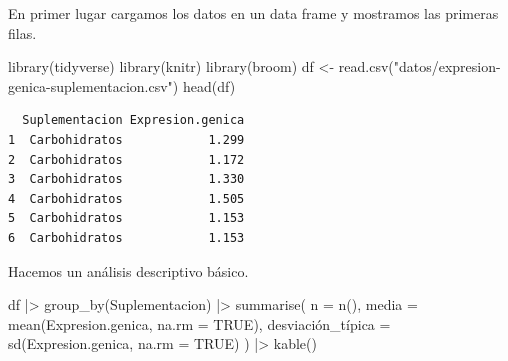 \documentclass[
  spanish,
  a4paper,
]{scrreport}
\newenvironment{Shaded}{\begin{snugshade}}{\end{snugshade}}
\newcommand{\AttributeTok}[1]{\textcolor[rgb]{0.40,0.45,0.13}{#1}}
\newcommand{\ConstantTok}[1]{\textcolor[rgb]{0.56,0.35,0.01}{#1}}
\newcommand{\FunctionTok}[1]{\textcolor[rgb]{0.28,0.35,0.67}{#1}}
\newcommand{\NormalTok}[1]{\textcolor[rgb]{0.00,0.23,0.31}{#1}}
\newcommand{\OtherTok}[1]{\textcolor[rgb]{0.00,0.23,0.31}{#1}}
\newcommand{\SpecialCharTok}[1]{\textcolor[rgb]{0.37,0.37,0.37}{#1}}
\newcommand{\StringTok}[1]{\textcolor[rgb]{0.13,0.47,0.30}{#1}}
\theoremstyle{definition}
\theoremstyle{remark}
\begin{document}
\begin{tcolorbox}[enhanced jigsaw, arc=.35mm, bottomrule=.15mm, bottomtitle=1mm, breakable, colback=white, colbacktitle=quarto-callout-tip-color!10!white, colframe=quarto-callout-tip-color-frame, coltitle=black, left=2mm, leftrule=.75mm, opacityback=0, opacitybacktitle=0.6, rightrule=.15mm, title=\textcolor{quarto-callout-tip-color}{\faLightbulb}\hspace{0.5em}{Solución}, titlerule=0mm, toprule=.15mm, toptitle=1mm]

En primer lugar cargamos los datos en un data frame y mostramos las
primeras filas.

\begin{Shaded}
\begin{Highlighting}[]
\FunctionTok{library}\NormalTok{(tidyverse)}
\FunctionTok{library}\NormalTok{(knitr)}
\FunctionTok{library}\NormalTok{(broom)}
\NormalTok{df }\OtherTok{\textless{}{-}} \FunctionTok{read.csv}\NormalTok{(}\StringTok{"datos/expresion{-}genica{-}suplementacion.csv"}\NormalTok{)}
\FunctionTok{head}\NormalTok{(df)}
\end{Highlighting}
\end{Shaded}

\begin{verbatim}
  Suplementacion Expresion.genica
1  Carbohidratos            1.299
2  Carbohidratos            1.172
3  Carbohidratos            1.330
4  Carbohidratos            1.505
5  Carbohidratos            1.153
6  Carbohidratos            1.153
\end{verbatim}

Hacemos un análisis descriptivo básico.

\begin{Shaded}
\begin{Highlighting}[]
\NormalTok{df }\SpecialCharTok{|\textgreater{}} 
    \FunctionTok{group\_by}\NormalTok{(Suplementacion) }\SpecialCharTok{|\textgreater{}} 
    \FunctionTok{summarise}\NormalTok{(}
        \AttributeTok{n =} \FunctionTok{n}\NormalTok{(),}
        \AttributeTok{media =} \FunctionTok{mean}\NormalTok{(Expresion.genica, }\AttributeTok{na.rm =} \ConstantTok{TRUE}\NormalTok{),}
\NormalTok{        desviación\_típica }\OtherTok{=} \FunctionTok{sd}\NormalTok{(Expresion.genica, }\AttributeTok{na.rm =} \ConstantTok{TRUE}\NormalTok{)}
\NormalTok{    ) }\SpecialCharTok{|\textgreater{}} 
    \FunctionTok{kable}\NormalTok{()}
\end{Highlighting}
\end{Shaded}


\end{tcolorbox}
\end{document}
